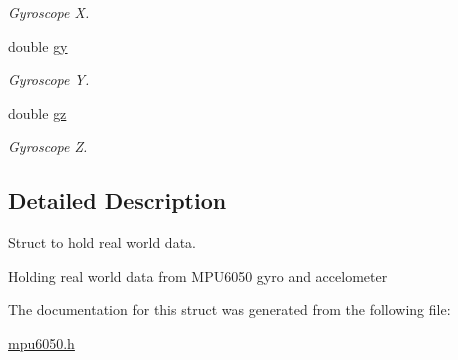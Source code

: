 \begin{DoxyCompactItemize}
\begin{DoxyCompactList}\small\item\em Gyroscope X. \end{DoxyCompactList}\item 
\hypertarget{structmpu6050__real__t_af04cd62106b52518c8607d5af085e196}{}double \hyperlink{structmpu6050__real__t_af04cd62106b52518c8607d5af085e196}{gy}\label{structmpu6050__real__t_af04cd62106b52518c8607d5af085e196}

\begin{DoxyCompactList}\small\item\em Gyroscope Y. \end{DoxyCompactList}\item 
\hypertarget{structmpu6050__real__t_a28d6c0c0ef38bda9d75ec0b52e641142}{}double \hyperlink{structmpu6050__real__t_a28d6c0c0ef38bda9d75ec0b52e641142}{gz}\label{structmpu6050__real__t_a28d6c0c0ef38bda9d75ec0b52e641142}

\begin{DoxyCompactList}\small\item\em Gyroscope Z. \end{DoxyCompactList}\end{DoxyCompactItemize}


\subsection{Detailed Description}
Struct to hold real world data. 

Holding real world data from M\+P\+U6050 gyro and accelometer 

The documentation for this struct was generated from the following file\+:\begin{DoxyCompactItemize}
\item 
\hyperlink{mpu6050_8h}{mpu6050.\+h}\end{DoxyCompactItemize}
